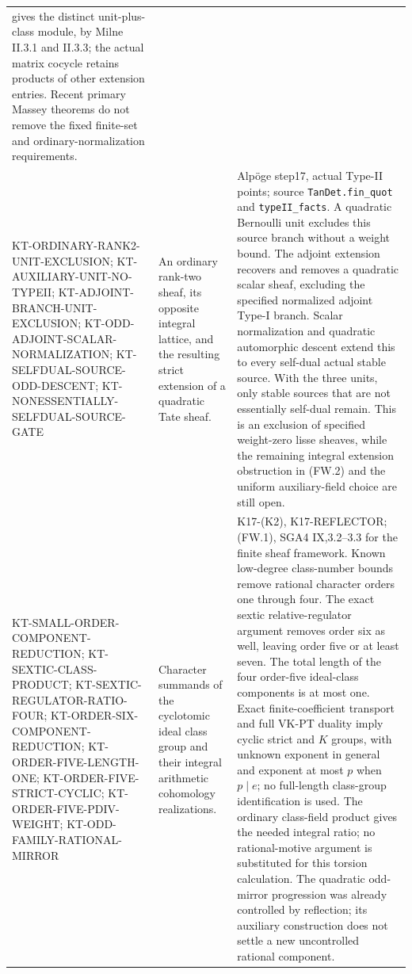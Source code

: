 \begin{longtable}{>{\raggedright\arraybackslash}p{}
>{\raggedright\arraybackslash}p{}
>{\raggedright\arraybackslash}p{}}
gives the distinct unit-plus-class module, by Milne II.3.1 and II.3.3;
the actual matrix cocycle retains products of other extension entries.
Recent primary Massey theorems do not remove the fixed finite-set
and ordinary-normalization requirements.\\
KT-ORDINARY-RANK2-UNIT-EXCLUSION;
KT-AUXILIARY-UNIT-NO-TYPEII; KT-ADJOINT-BRANCH-UNIT-EXCLUSION;
KT-ODD-ADJOINT-SCALAR-NORMALIZATION;
KT-SELFDUAL-SOURCE-ODD-DESCENT;
KT-NONESSENTIALLY-SELFDUAL-SOURCE-GATE &
An ordinary rank-two sheaf, its opposite integral lattice,
and the resulting strict extension of a quadratic Tate sheaf. &
Alp\"oge step17, actual Type-II points; source
\texttt{TanDet.fin\_quot} and \texttt{typeII\_facts}.
A quadratic Bernoulli unit excludes this source branch
without a weight bound. The adjoint extension recovers and
removes a quadratic scalar sheaf, excluding the specified
normalized adjoint Type-I branch. Scalar normalization and
quadratic automorphic descent extend this to every self-dual
actual stable source. With the three units, only stable
sources that are not essentially self-dual remain. This is
an exclusion of specified weight-zero lisse sheaves, while
the remaining integral extension obstruction in (FW.2)
and the uniform auxiliary-field choice are still open.\\
KT-SMALL-ORDER-COMPONENT-REDUCTION;
KT-SEXTIC-CLASS-PRODUCT;
KT-SEXTIC-REGULATOR-RATIO-FOUR;
KT-ORDER-SIX-COMPONENT-REDUCTION;
KT-ORDER-FIVE-LENGTH-ONE;
KT-ORDER-FIVE-STRICT-CYCLIC;
KT-ORDER-FIVE-PDIV-WEIGHT;
KT-ODD-FAMILY-RATIONAL-MIRROR &
Character summands of the cyclotomic ideal class group and
their integral arithmetic cohomology realizations. &
K17-(K2), K17-REFLECTOR; (FW.1), SGA4 IX,3.2--3.3 for the
finite sheaf framework. Known low-degree class-number bounds
remove rational character orders one through four. The exact
sextic relative-regulator argument removes order six as well,
leaving order five or at least seven. The total length of the
four order-five ideal-class components is at most one. Exact
finite-coefficient transport and full VK-PT duality imply cyclic
strict and $K$ groups, with unknown exponent in general and
exponent at most $p$ when $p\mid e$; no full-length
class-group identification is used. The ordinary class-field
product gives the needed integral ratio; no rational-motive
argument is substituted for this torsion calculation. The
quadratic odd-mirror progression was already controlled by
reflection; its auxiliary construction does not settle a new
uncontrolled rational component.\\

\end{longtable}
